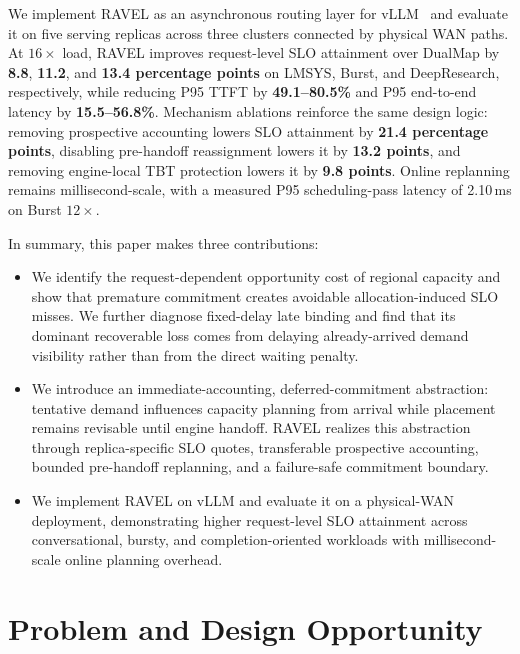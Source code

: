 \documentclass[letterpaper,twocolumn,10pt]{article}
\begin{document}
We implement RAVEL as an asynchronous routing layer for vLLM~\cite{vllm} and
evaluate it on five serving replicas across three clusters connected by
physical WAN paths.
At $16\times$ load, RAVEL improves request-level SLO attainment over DualMap by
\textbf{8.8}, \textbf{11.2}, and \textbf{13.4 percentage points} on LMSYS,
Burst, and DeepResearch, respectively, while reducing P95 TTFT by
\textbf{49.1--80.5\%} and P95 end-to-end latency by
\textbf{15.5--56.8\%}.
Mechanism ablations reinforce the same design logic: removing prospective
accounting lowers SLO attainment by \textbf{21.4 percentage points}, disabling
pre-handoff reassignment lowers it by \textbf{13.2 points}, and removing
engine-local TBT protection lowers it by \textbf{9.8 points}.
Online replanning remains millisecond-scale, with a measured P95
scheduling-pass latency of 2.10\,ms on Burst $12\times$.

In summary, this paper makes three contributions:
\begin{itemize}
    \item
    We identify the request-dependent opportunity cost of regional capacity and
    show that premature commitment creates avoidable allocation-induced SLO
    misses.
    We further diagnose fixed-delay late binding and find that its dominant
    recoverable loss comes from delaying already-arrived demand visibility
    rather than from the direct waiting penalty.

    \item
    We introduce an immediate-accounting, deferred-commitment abstraction:
    tentative demand influences capacity planning from arrival while placement
    remains revisable until engine handoff.
    RAVEL realizes this abstraction through replica-specific SLO quotes,
    transferable prospective accounting, bounded pre-handoff replanning, and a
    failure-safe commitment boundary.

    \item
    We implement RAVEL on vLLM and evaluate it on a physical-WAN deployment,
    demonstrating higher request-level SLO attainment across conversational,
    bursty, and completion-oriented workloads with millisecond-scale online
    planning overhead.
\end{itemize}




\section{Problem and Design Opportunity}
\label{sec:problem}
\end{document}
